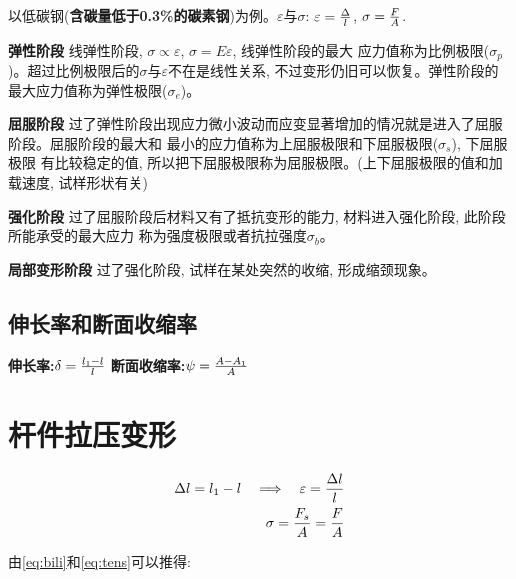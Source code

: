 {\indent 以低碳钢({\bf 含碳量低于0.3\%的碳素钢})为例。$\varepsilon$与$\sigma$:\quad%
$\varepsilon={\Delta\over l}$, $\sigma={F\over A}$.\par

\begin{description}
\item{\bf 弹性阶段} 线弹性阶段, $\sigma\propto\varepsilon$, $\sigma=E\varepsilon$, 线弹性阶段的最大%
应力值称为比例极限($\sigma_p$)。超过比例极限后的$\sigma$与$\varepsilon$不在是线性关系, %
不过变形仍旧可以恢复。弹性阶段的最大应力值称为弹性极限($\sigma_e$)。
\item{\bf 屈服阶段} 过了弹性阶段出现应力微小波动而应变显著增加的情况就是进入了屈服阶段。屈服阶段的最大和%
最小的应力值称为上屈服极限和下屈服极限($\sigma_s$), 下屈服极限%
有比较稳定的值, 所以把下屈服极限称为屈服极限。(上下屈服极限的值和加载速度, 试样形状有关)
\item{\bf 强化阶段} 过了屈服阶段后材料又有了抵抗变形的能力, 材料进入强化阶段, 此阶段所能承受的最大应力%
称为强度极限或者抗拉强度$\sigma_b$。
\item{\bf 局部变形阶段} 过了强化阶段, 试样在某处突然的收缩, 形成缩颈现象。
\end{description}

\subsection{伸长率和断面收缩率}

{\indent\bf 伸长率:}\quad$\delta={l_1-l\over l}$\newline
{\indent\bf 断面收缩率:}\quad$\psi={A-A_1\over A}$\par

\section{杆件拉压变形}

\begin{subequations}
\begin{align}
\Delta l=l_1 - l \quad\Longrightarrow\quad \varepsilon = {\Delta l\over l}\label{eq:bili}\\
\sigma={F_s\over A}={F\over A}\label{eq:tens}
\end{align}
\end{subequations}

{由\ref{eq:bili}和\ref{eq:tens}可以推得:}\newline

}
